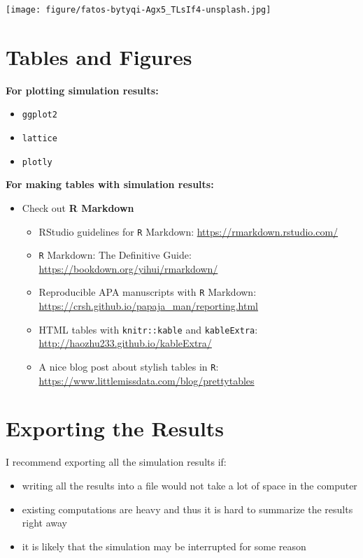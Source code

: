 \documentclass[
]{book}
\providecommand{\tightlist}{%
  \setlength{\itemsep}{0pt}\setlength{\parskip}{0pt}}
\begin{document}
\texttt{[image: figure/fatos-bytyqi-Agx5\_TLsIf4-unsplash.jpg]}

\hypertarget{tables-and-figures}{%
\section{Tables and Figures}\label{tables-and-figures}}

\textbf{For plotting simulation results:}

\begin{itemize}
\tightlist
\item
  \texttt{ggplot2} \citep{R-ggplot2}
\item
  \texttt{lattice} \citep{R-lattice}
\item
  \texttt{plotly} \citep{R-plotly}
\end{itemize}

\textbf{For making tables with simulation results:}

\begin{itemize}
\tightlist
\item
  Check out \textbf{R Markdown}

  \begin{itemize}
  \tightlist
  \item
    RStudio guidelines for \texttt{R} Markdown: \url{https://rmarkdown.rstudio.com/}
  \item
    \texttt{R} Markdown: The Definitive Guide: \url{https://bookdown.org/yihui/rmarkdown/}
  \item
    Reproducible APA manuscripts with \texttt{R} Markdown: \url{https://crsh.github.io/papaja_man/reporting.html}
  \item
    HTML tables with \texttt{knitr::kable} and \texttt{kableExtra}: \url{http://haozhu233.github.io/kableExtra/}
  \item
    A nice blog post about stylish tables in \texttt{R}: \url{https://www.littlemissdata.com/blog/prettytables}
  \end{itemize}
\end{itemize}

\hypertarget{exporting-the-results}{%
\section{Exporting the Results}\label{exporting-the-results}}

I recommend exporting all the simulation results if:

\begin{itemize}
\tightlist
\item
  writing all the results into a file would not take a lot of space in the computer
\item
  existing computations are heavy and thus it is hard to summarize the results right away
\item
  it is likely that the simulation may be interrupted for some reason
\end{itemize}
\end{document}
